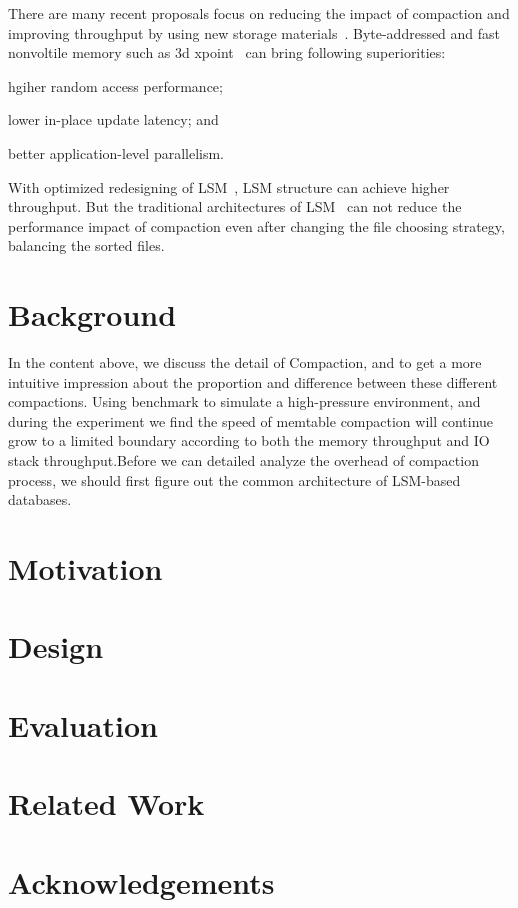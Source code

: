 \documentclass[letterpaper,twocolumn,10pt]{article}
\begin{document}
There are many recent proposals focus on reducing the impact of compaction and improving throughput by using new storage materials~\cite{kannan2018redesigning,chen2017kvftl,zhang2017flashkv,xia2017hikv,wu2018kvssd,sun2018co,shen2017didacache}. Byte-addressed and fast nonvoltile memory such as 3d xpoint~\cite{3dxpoint} can bring following superiorities:
\begin{inparaenum}[1)]
    \item hgiher random access performance;
    \item lower in-place update latency; and
    \item better application-level parallelism.
\end{inparaenum}
With optimized redesigning of LSM~\cite{kannan2018redesigning}, LSM structure can achieve higher throughput. But the traditional architectures of LSM~\cite{comapction_types} can not reduce the performance impact of compaction even after changing the file choosing strategy, balancing the sorted files.


\section{Background}
In the content above, we discuss the detail of Compaction, and to get a more intuitive impression about the proportion and difference between these different compactions. Using benchmark to simulate a high-pressure environment, and during the experiment we find the speed of memtable compaction will continue grow to a limited boundary according to both the memory throughput and IO stack throughput.Before we can detailed analyze the overhead of compaction process, we should first figure out the common architecture of LSM-based databases.
\section{Motivation}

\section{Design}

\section{Evaluation}

\section{Related Work}

\section{Acknowledgements}




\end{document}
